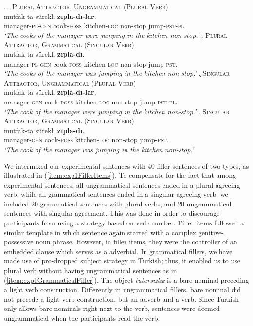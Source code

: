 \documentclass[doc,a4paper,man,natbib,floatsintext,noextraspace]{apa6}
\begin{document}
\ex. \label{item:exp1ExperimentalItems}
%
\a. \textsc{Plural Attractor, Ungrammatical (Plural Verb)} \label{item:exp1expitem-plpl}\\ 
   mutfak-ta sürekli \textbf{zıpla-dı-lar}.\\ 
  manager-\textsc{pl}-\textsc{gen}  cook-\textsc{poss} kitchen-\textsc{loc} non-stop  jump-\textsc{pst}-\textsc{pl}.\\
  \glt \textit{`The cooks of the manager were jumping in the kitchen non-stop.'}
%
\b. \textsc{Plural Attractor, Grammatical (Singular Verb)} \label{item:exp1expitem-plsg}\\ 
   mutfak-ta sürekli \textbf{zıpla-dı}.\\ 
  manager-\textsc{pl}-\textsc{gen}  cook-\textsc{poss} kitchen-\textsc{loc} non-stop  jump-\textsc{pst}.\\
  \glt \textit{`The cooks of the manager was jumping in the kitchen non-stop.'}
%
\c. \textsc{Singular Attractor, Ungrammatical (Plural Verb)} \label{item:exp1expitem-sgpl}\\ 
   mutfak-ta sürekli \textbf{zıpla-dı-lar}.\\ 
  manager-\textsc{gen}  cook-\textsc{poss} kitchen-\textsc{loc} non-stop  jump-\textsc{pst}-\textsc{pl}.\\
  \glt \textit{`The cook of the manager were jumping in the kitchen non-stop.'}
%
\d. \textsc{Singular Attractor, Grammatical (Singular Verb)}\label{item:exp1expitem-sgsg}\\ 
   mutfak-ta sürekli \textbf{zıpla-dı}. \\ 
  manager-\textsc{gen}  cook-\textsc{poss} kitchen-\textsc{loc} non-stop  jump-\textsc{pst}.\\
  \glt \textit{`The cook of the manager was jumping in the kitchen non-stop.'}

We intermixed our experimental sentences with 40 filler sentences of two types, as illustrated in (\ref{item:exp1FillerItems}). 
To compensate for the fact that among experimental sentences, all ungrammatical sentences ended in a plural-agreeing verb, while all grammatical sentences ended in a singular-agreeing verb, we included 20 grammatical sentences with plural verbs, and 20 ungrammatical sentences with singular agreement. 
This was done in order to discourage participants from using a strategy based on verb number. 
Filler items followed a similar template in which sentence again started with a complex genitive-possessive noun phrase. 
However, in filler items, they were the controller of an embedded clause which serves as a adverbial. 
In grammatical fillers, we have made use of pro-dropped subject strategy in Turkish; thus, it enabled us to use plural verb without having ungrammatical sentences as in (\ref{item:exp1GrammaticalFiller}). The object \textit{tutarsızlık} is a bare nominal preceding a light verb construction. 
Differently in ungrammatical fillers, bare nominal did not precede a light verb construction, but an adverb and a verb. Since Turkish only allows bare nominals right next to the verb, sentences were deemed ungrammatical when the participants read the verb. 
\end{document}
